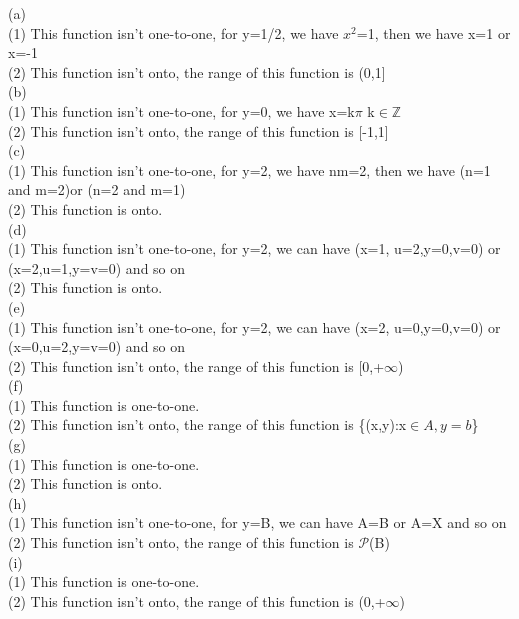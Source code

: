 \documentclass[11pt, a4paper, UTF8]{ctexart}
\begin{document}
\begin{solution}
(a)\\
(1) This function isn't one-to-one, for y=1/2, we have $x^2$=1, then we have x=1 or x=-1\\
(2) This function isn't onto, the range of this function is (0,1]\\
(b)\\
(1) This function isn't one-to-one, for y=0, we have x=k$\pi$ k$\in$$\mathbb{Z}$\\
(2) This function isn't onto, the range of this function is [-1,1]\\
(c)\\
(1) This function isn't one-to-one, for y=2, we have nm=2, then we have (n=1 and m=2)or (n=2 and m=1)\\
(2) This function is onto.\\
(d)\\
(1) This function isn't one-to-one, for y=2, we can have (x=1, u=2,y=0,v=0) or (x=2,u=1,y=v=0) and so on\\
(2) This function is onto.\\
(e)\\
(1) This function isn't one-to-one, for y=2, we can have (x=2, u=0,y=0,v=0) or (x=0,u=2,y=v=0) and so on\\
(2) This function isn't onto, the range of this function is [0,+$\infty$)\\
(f)\\
(1) This function is one-to-one.\\
(2) This function isn't onto, the range of this function is \{(x,y):x$\in A,y=b$\}\\
(g)\\
(1) This function is one-to-one.\\
(2) This function is onto.\\
(h)\\
(1) This function isn't one-to-one, for y=B, we can have A=B or A=X and so on\\
(2) This function isn't onto, the range of this function is $\mathcal{P}$(B)\\
(i)\\
(1) This function is one-to-one.\\
(2) This function isn't onto, the range of this function is (0,+$\infty$)\\

\end{solution}
\end{document}
